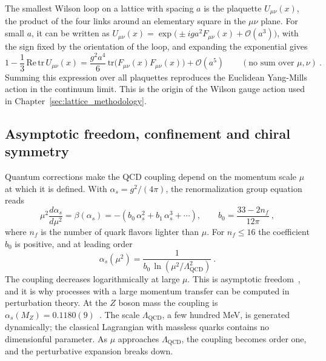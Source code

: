 The smallest Wilson loop on a lattice with spacing $a$ is the plaquette $U_{\mu\nu}(x)$, the product of the four links around an elementary square in the $\mu\nu$ plane. For small $a$, it can be written as $U_{\mu\nu}(x) = \exp\big(\pm i g a^2 F_{\mu\nu}(x) + \mathcal{O}(a^3)\big)$, with the sign fixed by the orientation of the loop, and expanding the exponential gives
\begin{equation}
  1 - \frac{1}{3}\,\mathrm{Re}\,\mathrm{tr}\,U_{\mu\nu}(x) = \frac{g^2 a^4}{6}\,\mathrm{tr}\big(F_{\mu\nu}(x)F_{\mu\nu}(x)\big) + \mathcal{O}(a^5) \qquad (\text{no sum over } \mu,\nu) \ .
  \label{eq:plaquette_expansion}
\end{equation}
Summing this expression over all plaquettes reproduces the Euclidean Yang-Mills action in the continuum limit. This is the origin of the Wilson gauge action used in Chapter~\ref{sec:lattice_methodology}.

\subsection{Asymptotic freedom, confinement and chiral symmetry}
\label{sec:af_confinement}

Quantum corrections make the QCD coupling depend on the momentum scale $\mu$ at which it is defined. With $\alpha_s = g^2/(4\pi)$, the renormalization group equation reads
\begin{equation}
  \mu^2\frac{d\alpha_s}{d\mu^2} = \beta(\alpha_s) = -\left(b_0\,\alpha_s^2 + b_1\,\alpha_s^3 + \cdots\right) ,
  \qquad b_0 = \frac{33 - 2n_f}{12\pi} \ ,
  \label{eq:beta_function}
\end{equation}
where $n_f$ is the number of quark flavors lighter than $\mu$. For $n_f \le 16$ the coefficient $b_0$ is positive, and at leading order
\begin{equation}
  \alpha_s(\mu^2) = \frac{1}{b_0\,\ln\left(\mu^2/\Lambda_{\text{QCD}}^2\right)} \ .
  \label{eq:running_coupling}
\end{equation}
The coupling decreases logarithmically at large $\mu$. This is asymptotic freedom~\cite{Gross:1973id,Politzer:1973fx}, and it is why processes with a large momentum transfer can be computed in perturbation theory. At the $Z$ boson mass the coupling is $\alpha_s(M_Z) = 0.1180(9)$~\cite{ParticleDataGroup:2024cfk}. The scale $\Lambda_{\text{QCD}}$, a few hundred MeV, is generated dynamically; the classical Lagrangian with massless quarks contains no dimensionful parameter. As $\mu$ approaches $\Lambda_{\text{QCD}}$, the coupling becomes order one, and the perturbative expansion breaks down.

